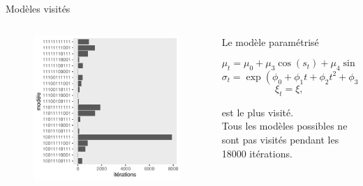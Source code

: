 \documentclass[aspectratio=169]{beamer}
\begin{document}
\begin{frame}{Modèles visités}
\begin{columns}
	\begin{column}{0.4\textwidth}
		\begin{figure}
		\vspace{-0.4cm}
	 		\includegraphics[height=0.85\textheight, center]{../figures/models.pdf}
		\end{figure}
	\end{column}
	\begin{column}{0.6\textwidth}
    Le modèle paramétrisé
    \begin{fleqn}
    \begin{equation*}
		\mu_t = \mu_0 + \mu_3 \cos(s_t) + \mu_4 \sin(s_t),
	\end{equation*}
	\begin{equation*}
		\sigma_t = \exp(\phi_0 + \phi_1 t + \phi_2 t^2 + \phi_3 \cos(s_t) + \phi_4 \sin(s_t)),
	\end{equation*}
	\begin{equation*}
		\xi_t = \xi,
	\end{equation*}
	\end{fleqn}
	est le plus visité.
	\vspace{0.5cm} \\
	Tous les modèles possibles ne sont pas visités pendant les 18000 itérations.
	\end{column}
\end{columns}
\end{frame}
\end{document}
